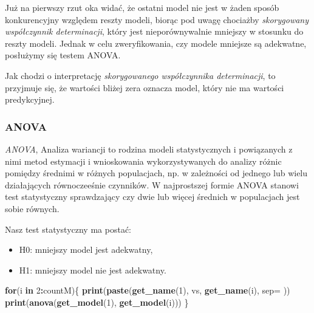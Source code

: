 \documentclass[
]{article}
\newenvironment{Shaded}{\begin{snugshade}}{\end{snugshade}}
\newcommand{\AttributeTok}[1]{\textcolor[rgb]{0.13,0.29,0.53}{#1}}
\newcommand{\ControlFlowTok}[1]{\textcolor[rgb]{0.13,0.29,0.53}{\textbf{#1}}}
\newcommand{\DecValTok}[1]{\textcolor[rgb]{0.00,0.00,0.81}{#1}}
\newcommand{\FunctionTok}[1]{\textcolor[rgb]{0.13,0.29,0.53}{\textbf{#1}}}
\newcommand{\NormalTok}[1]{#1}
\newcommand{\SpecialCharTok}[1]{\textcolor[rgb]{0.81,0.36,0.00}{\textbf{#1}}}
\newcommand{\StringTok}[1]{\textcolor[rgb]{0.31,0.60,0.02}{#1}}
\providecommand{\tightlist}{%
  \setlength{\itemsep}{0pt}\setlength{\parskip}{0pt}}
\begin{document}
Już na pierwszy rzut oka widać, że ostatni model nie jest w żaden sposób
konkurencyjny względem reszty modeli, biorąc pod uwagę chociażby
\emph{skorygowany współczynnik determinacji}, który jest
nieporównywalnie mniejszy w stosunku do reszty modeli. Jednak w celu
zweryfikowania, czy modele mniejsze są adekwatne, posłużymy się testem
ANOVA.

Jak chodzi o interpretację \emph{skorygowanego współczynnika
determinacji}, to przyjmuje się, że wartości bliżej zera oznacza model,
który nie ma wartości predykcyjnej.

\subsubsection{ANOVA}\label{anova}

\emph{ANOVA}, Analiza wariancji to rodzina modeli statystycznych i
powiązanych z nimi metod estymacji i wnioskowania wykorzystywanych do
analizy różnic pomiędzy średnimi w różnych populacjach, np. w zależności
od jednego lub wielu działających równoczeeśnie czynników. W
najprostszej formie ANOVA stanowi test statystyczny sprawdzający czy
dwie lub więcej średnich w populacjach jest sobie równych.

Nasz test statystyczny ma postać:

\begin{itemize}
\tightlist
\item
  H0: mniejszy model jest adekwatny,
\item
  H1: mniejszy model nie jest adekwatny.
\end{itemize}

\begin{Shaded}
\begin{Highlighting}[]
\ControlFlowTok{for}\NormalTok{(i }\ControlFlowTok{in} \DecValTok{2}\SpecialCharTok{:}\NormalTok{countM)\{}
  \FunctionTok{print}\NormalTok{(}\FunctionTok{paste}\NormalTok{(}\FunctionTok{get\_name}\NormalTok{(}\DecValTok{1}\NormalTok{), }\StringTok{\textquotesingle{}vs\textquotesingle{}}\NormalTok{, }\FunctionTok{get\_name}\NormalTok{(i), }\AttributeTok{sep=}\StringTok{\textquotesingle{} \textquotesingle{}}\NormalTok{))}
  \FunctionTok{print}\NormalTok{(}\FunctionTok{anova}\NormalTok{(}\FunctionTok{get\_model}\NormalTok{(}\DecValTok{1}\NormalTok{), }\FunctionTok{get\_model}\NormalTok{(i)))}
\NormalTok{\}}
\end{Highlighting}
\end{Shaded}
\end{document}
